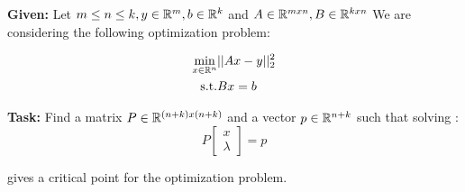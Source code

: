 \textbf{Given:} Let $m \leq n \leq k, y \in \mathbb{R}^m, b\in \mathbb{R}^k$ and $A \in \mathbb{R}^{mxn},B \in \mathbb{R}^{kxn}$
We are considering the following optimization problem:

\begin{align*}
    \min_{x \in \mathbb{R}^n} &||Ax-y||_2^2\\
    \text{s.t.}              & Bx=b  
\end{align*}

\textbf{Task:} Find a matrix $P \in \mathbb{R}^{(n+k)x(n+k)}$ and a vector $p \in \mathbb{R}^{n+k}$ such that solving :
\[
P  \begin{bmatrix}  x \\ \lambda \end{bmatrix} =p   
\]

gives a critical point for the optimization problem.

